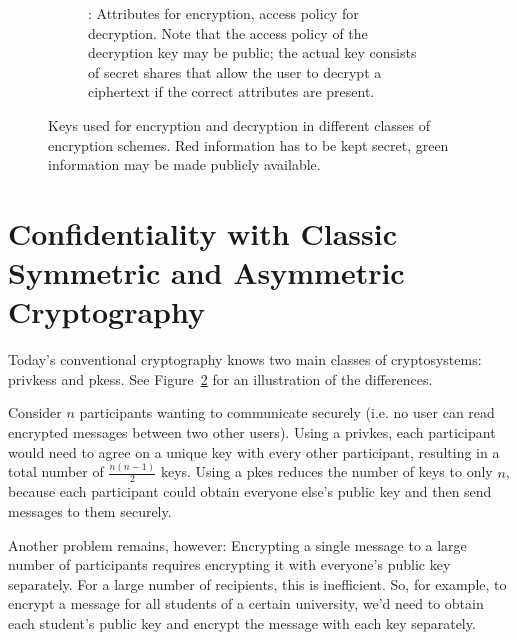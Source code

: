 \begin{figure}
\begin{subfigure}{.8\textwidth}
        \caption{: Attributes for encryption, access policy for decryption. Note that the access policy of the decryption key may be public; the actual key consists of secret shares that allow the user to decrypt a ciphertext if the correct attributes are present.} \label{fig:keys-abe}
    \end{subfigure}
    \caption[Keys in different classes of encryption schemes]{Keys used for encryption and decryption in different classes of encryption schemes. Red information has to be kept secret, green information may be made publicly available.}
    \label{fig:key-use}
\end{figure}

\section{Confidentiality with Classic Symmetric and Asymmetric Cryptography}
Today's conventional cryptography knows two main classes of cryptosystems: \glspl{privkes} and \glspl{pkes}. See Figure~\ref{fig:key-use} for an illustration of the differences.

Consider $n$ participants wanting to communicate securely (i.e. no user can read encrypted messages between two other users).
Using a \gls{privkes}, each participant would need to agree on a unique key with every other participant, resulting in a total number of $\frac{n(n-1)}{2}$ keys.
Using a \gls{pkes} reduces the number of keys to only $n$, because each participant could obtain everyone else's public key and then send messages to them securely.

Another problem remains, however: Encrypting a single message to a large number of participants requires encrypting it with everyone's public key separately.
For a large number of recipients, this is inefficient.
So, for example, to encrypt a message for all students of a certain university, we'd need to obtain each student's public key and encrypt the message with each key separately.

